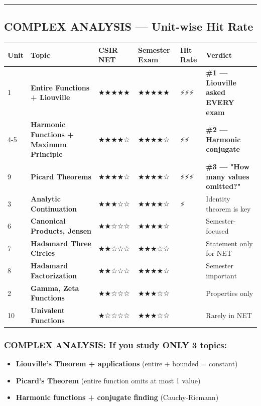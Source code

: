 \documentclass[12pt,a4paper,openany]{book}
\begin{document}
{\bigskip\noindent\rule{\textwidth}{0.4pt}\bigskip

\subsection{ COMPLEX ANALYSIS — Unit-wise Hit Rate}

\begin{center}
\begin{tabular}{|l|l|l|l|l|l|}
\hline
\textbf{Unit} & \textbf{Topic} & \textbf{CSIR NET} & \textbf{Semester Exam} & \textbf{Hit Rate} & \textbf{Verdict} \\
\hline
1 & \textbf{Entire Functions + Liouville} & ★★★★★ & ★★★★★ & ⚡⚡⚡ & \textbf{\#1 — Liouville asked EVERY exam} \\
\hline
4-5 & \textbf{Harmonic Functions + Maximum Principle} & ★★★★☆ & ★★★★☆ & ⚡⚡ & \textbf{\#2 — Harmonic conjugate} \\
\hline
9 & \textbf{Picard Theorems} & ★★★★☆ & ★★★★☆ & ⚡⚡⚡ & \textbf{\#3 — "How many values omitted?"} \\
\hline
3 & \textbf{Analytic Continuation} & ★★★☆☆ & ★★★★☆ & ⚡ & Identity theorem is key \\
\hline
6 & \textbf{Canonical Products, Jensen} & ★★☆☆☆ & ★★★★☆ &  & Semester-focused \\
\hline
7 & \textbf{Hadamard Three Circles} & ★★☆☆☆ & ★★★☆☆ &  & Statement only for NET \\
\hline
8 & \textbf{Hadamard Factorization} & ★★☆☆☆ & ★★★★☆ &  & Semester important \\
\hline
2 & \textbf{Gamma, Zeta Functions} & ★★☆☆☆ & ★★★☆☆ &  & Properties only \\
\hline
10 & \textbf{Univalent Functions} & ★☆☆☆☆ & ★★★☆☆ &  & Rarely in NET \\
\hline
\end{tabular}
\end{center}

\subsubsection{ COMPLEX ANALYSIS: If you study ONLY 3 topics:}
\begin{itemize}
  \item \textbf{Liouville's Theorem + applications} (entire + bounded = constant)
  \item \textbf{Picard's Theorem} (entire function omits at most 1 value)
  \item \textbf{Harmonic functions + conjugate finding} (Cauchy-Riemann)
\end{itemize}

}
\end{document}

